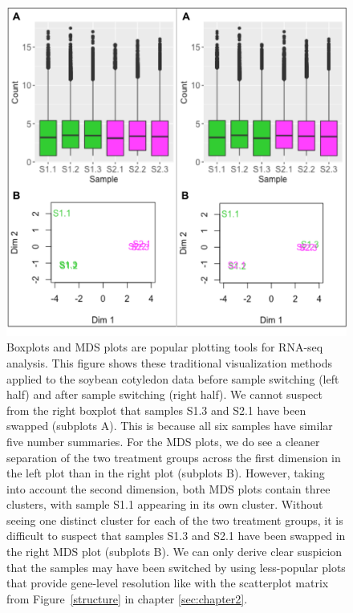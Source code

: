 \documentclass[11pt,a4paper,oldfontcommands,openany]{memoir}
\numberwithin{equation}{section} %
\begin{document}
\clearpage
\null
\begin{figure}[!t]
\centerline{\includegraphics[width=0.7\columnwidth]{MakeFigures/mdsSwitch.png}}
\caption{Boxplots and MDS plots are popular plotting tools for RNA-seq analysis. This figure shows these traditional visualization methods applied to the soybean cotyledon data before sample switching (left half) and after sample switching (right half). We cannot suspect from the right boxplot that samples S1.3 and S2.1 have been swapped (subplots A). This is because all six samples have similar five number summaries. For the MDS plots, we do see a cleaner separation of the two treatment groups across the first dimension in the left plot than in the right plot (subplots B). However, taking into account the second dimension, both MDS plots contain three clusters, with sample S1.1 appearing in its own cluster. Without seeing one distinct cluster for each of the two treatment groups, it is difficult to suspect that samples S1.3 and S2.1 have been swapped in the right MDS plot (subplots B). We can only derive clear suspicion that the samples may have been switched by using less-popular plots that provide gene-level resolution like with the scatterplot matrix from Figure~\ref{structure} in chapter \ref{sec:chapter2}.
\label{mdsSwitch}}
\end{figure}
\end{document}
